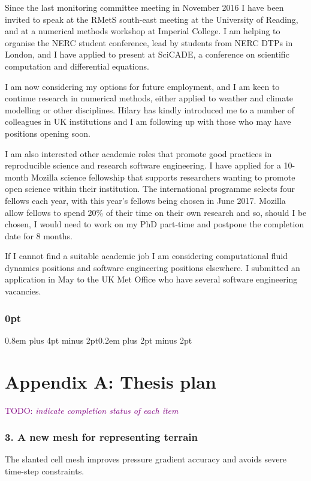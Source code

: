 \documentclass[a4paper,11pt]{article}
\newcommand{\TODO}[1]{\textcolor{purple}{TODO: \emph{#1}}}
\begin{document}
Since the last monitoring committee meeting in November 2016 I have been invited to speak at the RMetS south-east meeting at the University of Reading, and at a numerical methods workshop at Imperial College.  I am helping to organise the NERC student conference, lead by students from NERC DTPs in London, and I have applied to present at SciCADE, a conference on scientific computation and differential equations.

I am now considering my options for future employment, and I am keen to continue research in numerical methods, either applied to weather and climate modelling or other disciplines.
Hilary has kindly introduced me to a number of colleagues in UK institutions and I am following up with those who may have positions opening soon.

I am also interested other academic roles that promote good practices in reproducible science and research software engineering.
I have applied for a 10-month Mozilla science fellowship that supports researchers wanting to promote open science within their institution.
The international programme selects four fellows each year, with this year's fellows being chosen in June 2017.
Mozilla allow fellows to spend 20\% of their time on their own research and so, should I be chosen, I would need to work on my PhD part-time and postpone the completion date for 8 months.

If I cannot find a suitable academic job I am considering computational fluid dynamics positions and software engineering positions elsewhere.
I submitted an application in May to the UK Met Office who have several software engineering vacancies.


                                                 


\newpage

\titlespacing\subsubsection{0pt}{0.8em plus 4pt minus 2pt}{0.2em plus 2pt minus 2pt}

\section*{Appendix A: Thesis plan}
\footnotesize
\TODO{indicate completion status of each item}

\subsubsection*{3. A new mesh for representing terrain}
\noindent The slanted cell mesh improves pressure gradient accuracy and avoids severe time-step constraints.
\end{document}

